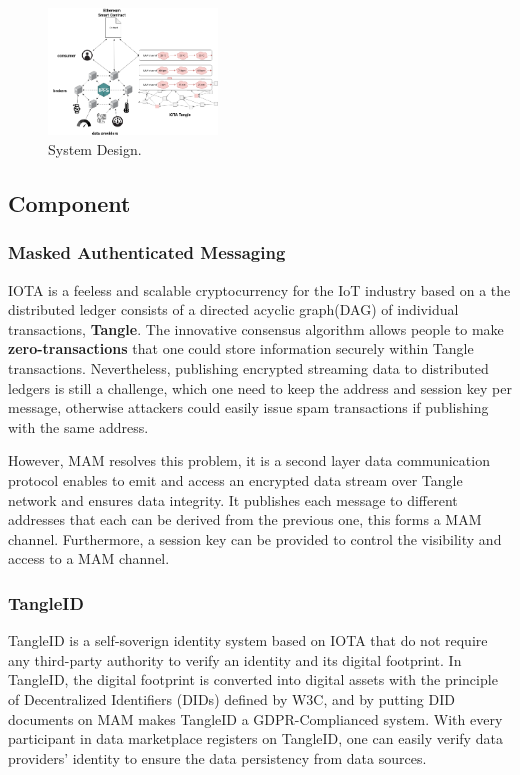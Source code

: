 \documentclass[journal,10pt,a4paper]{IEEEtran}
\begin{document}
\begin{figure}[h]
    \centering
    \includegraphics[width=0.4\textwidth]{system_design}
    \caption{System Design.}
    \label{fig:system_design}
\end{figure}

\subsection{Component}
\subsubsection{Masked Authenticated Messaging}
IOTA\cite{IOTAwhitepaper} is a feeless and scalable cryptocurrency for the IoT industry based on a the distributed  ledger consists of a directed acyclic graph(DAG) of individual transactions, \textbf{Tangle}. The innovative consensus algorithm allows people to make \textbf{zero-transactions} that one could store information securely within Tangle transactions. Nevertheless, publishing encrypted streaming data to distributed ledgers is still a challenge, which one need to keep the address and session key per message, otherwise attackers could easily issue spam transactions if publishing with the same address.

However, MAM resolves this problem, it is a second layer data communication protocol enables to emit and access an encrypted data stream over Tangle network and ensures data integrity.
It publishes each message to different addresses that each can be derived from the previous one, this forms a MAM channel. Furthermore, a session key can be provided to control the visibility and access to a MAM channel.

\subsubsection{TangleID}
TangleID\cite{TangleID} is a self-soverign identity system based on IOTA that do not require any third-party authority to verify an identity and its digital footprint. In TangleID, the digital footprint is converted into digital assets with the principle of Decentralized Identifiers (DIDs)\cite{DID} defined by W3C, and by putting DID documents on MAM makes TangleID a GDPR-Complianced system. With every participant in data marketplace registers on TangleID, one can easily verify data providers' identity to ensure the data persistency from data sources.
\end{document}
